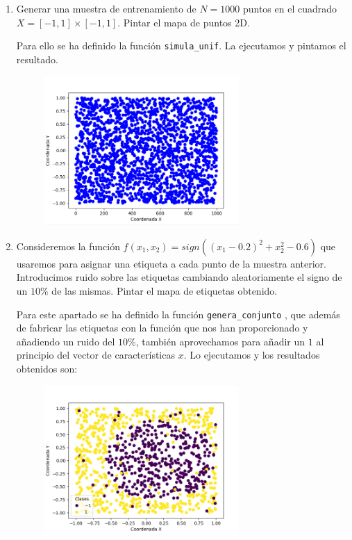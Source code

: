 \documentclass[size=a4, parskip=half, titlepage=false, toc=flat, toc=bib, 12pt]{scrartcl}
\begin{document}
\begin{enumerate}
\begin{enumerate}
\item Generar una muestra de entrenamiento de $N = 1000$ puntos en el cuadrado
$X = [−1, 1] × [−1, 1]$. Pintar el mapa de puntos 2D.

Para ello se ha definido la función \verb|simula_unif|. La ejecutamos y pintamos el resultado.

\begin{figure}[H]
\centering
\includegraphics[width=0.7\textwidth]{./img/ej23}
\end{figure}

\item Consideremos la función $f (x_1 , x_2 ) = sign((x_1 − 0.2)^2 + x_2^2 − 0.6)$ que usaremos
para asignar una etiqueta a cada punto de la muestra anterior. Introducimos
ruido sobre las etiquetas cambiando aleatoriamente el signo de un $10 \%$ de las
mismas. Pintar el mapa de etiquetas obtenido.

Para este apartado se ha definido la función \verb|genera_conjunto| , que además de fabricar
las etiquetas con la función que nos han proporcionado y añadiendo un ruido del $10 \%$, también
aprovechamos para añadir un $1$ al principio del vector de características $x$. Lo ejecutamos
y los resultados obtenidos son:

\begin{figure}[H]
\centering
\includegraphics[width=0.7\textwidth]{./img/ej24}
\end{figure}


\end{enumerate}
\end{enumerate}
\end{document}
